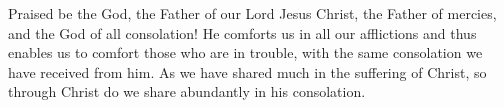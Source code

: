 \lettrine[lines=3]{P}{}raised be the God, the Father of our Lord Jesus Christ, the Father of mercies, and the God of all consolation! He comforts us in all our afflictions and thus enables us to comfort those who are in trouble, with the same consolation we have received from him. As we have shared much in the suffering of Christ, so through Christ do we share abundantly in his consolation.
